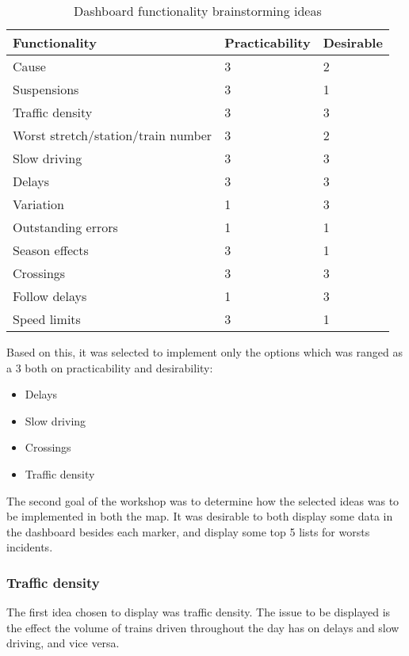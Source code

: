 \begin{table}[!h]\small
	\begin{tabularx}{\textwidth}{|X|l|l|}
		\hline
		Functionality & Practicability & Desirable \\
		\hline
		Cause & 3 & 2\\
		\hline
		Suspensions & 3 & 1\\
		\hline
		Traffic density & 3 & 3\\
		\hline
	 	Worst stretch/station/train number & 3 & 2\\
		\hline
		Slow driving & 3 & 3\\
		\hline
		Delays & 3 & 3\\
		\hline
		Variation & 1 & 3\\
		\hline
		Outstanding errors & 1 & 1\\
		\hline
		Season effects & 3 & 1\\
		\hline
		Crossings & 3 & 3\\
		\hline
		Follow delays & 1 & 3\\
		\hline
		Speed limits & 3 & 1\\
		\hline
	\end{tabularx}
\caption{Dashboard functionality brainstorming ideas}
\label{table:dashboard_functionality_wants_vs_needs}
\end{table}

Based on this, it was selected to implement only the options which was ranged
as a 3 both on practicability and desirability:

\begin{itemize}
  \item Delays
  \item Slow driving
  \item Crossings
  \item Traffic density
\end{itemize}

The second goal of the workshop was to determine how the selected ideas was to
be implemented in both the map. It was desirable to both display some data in
the dashboard besides each marker, and display some top 5 lists for worsts
incidents.

\clearpage
\subsubsection{Traffic density} %
\label{ssub:traffic_density}
The first idea chosen to display was traffic density. The issue to be displayed
is the effect the volume of trains driven throughout the day has on delays and
slow driving, and vice versa.

